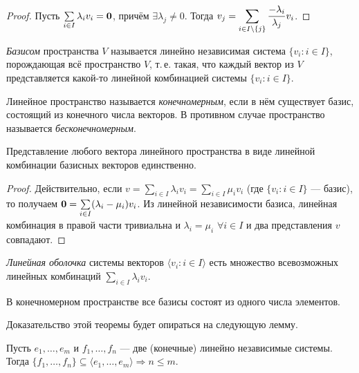 \begin{proof}
    Пусть $\sum\limits_{i \in I}\lambda_iv_i = \boldsymbol{0}$, причём $\exists\lambda_j \ne 0$. Тогда $\displaystyle v_j = \sum_{i \in I \setminus \{j\}}\frac{-\lambda_i}{\lambda_j}v_i$.
\end{proof}

\begin{definition}
    \textit{Базисом} пространства $V$ называется линейно независимая система $\{v_i : i \in I\}$, порождающая всё пространство $V$, т.\,е. такая, что каждый вектор из $V$ представляется какой-то линейной комбинацией системы $\{v_i : i \in I\}$.
\end{definition}

\begin{definition}
    Линейное пространство называется \textit{конечномерным}, если в нём существует базис, состоящий из конечного числа векторов. В противном случае пространство называется \textit{бесконечномерным}.
\end{definition}

\begin{proposal}
    Представление любого вектора линейного пространства в виде линейной комбинации базисных векторов единственно.
\end{proposal}

\begin{proof}
    Действительно, если $v = \sum\limits_{i \in I}\lambda_iv_i = \sum\limits_{i \in I}\mu_iv_i$ (где $\{v_i : i \in I\}$ --- базис), то получаем $\boldsymbol{0} = \sum\limits_{i \in I}(\lambda_i - \mu_i)v_i$. Из линейной независимости базиса, линейная комбинация в правой части тривиальна и $\lambda_i = \mu_i$ $\forall i \in I$ и два представления $v$ совпадают.
\end{proof}

\begin{definition}
    \textit{Линейная оболочка} системы векторов $\langle v_i : i \in I \rangle$ есть множество всевозможных линейных комбинаций $\sum\limits_{i \in I}\lambda_iv_i$.
\end{definition}

\begin{theorem}
    В конечномерном пространстве все базисы состоят из одного числа элементов.
\end{theorem}

Доказательство этой теоремы будет опираться на следующую лемму.

\begin{lemma}
    Пусть $e_1, \ldots, e_m$ и $f_1, \ldots, f_n$ --- две (конечные) линейно независимые системы. Тогда $\{f_1, \ldots, f_n\} \subseteq \langle e_1, \ldots, e_m\rangle \Rightarrow n \leqslant m$.
\end{lemma}

